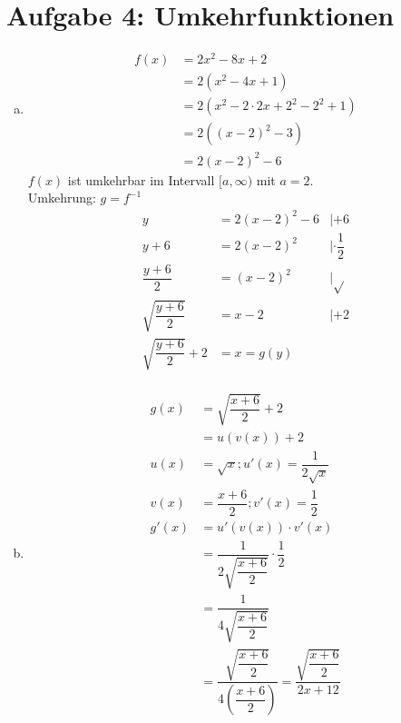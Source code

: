 \documentclass[
    10pt,
    parskip=half-,
    paper=a4,
    english,ngerman,
    fleqn
]{scrartcl}
\begin{document}
\section*{Aufgabe 4: Umkehrfunktionen}
\begin{enumerate}[a)]
\item
    \begin{align*}
        f(x) &= 2x^2 - 8x + 2\\
             &= 2(x^2 - 4x + 1)\\
             &= 2(x^2 - 2\cdot2x + 2^2 - 2^2 + 1)\\
             &= 2((x-2)^2 - 3)\\
             &= 2(x-2)^2 - 6
    \end{align*}
    $f(x)$ ist umkehrbar im Intervall $[a, \infty)$ mit $a = 2$.\\
    Umkehrung: $g = f^{-1}$
    \begin{align*}
        y &= 2(x-2)^2 - 6 &| +6\\
        y + 6 &= 2(x-2)^2 &| \cdot\dfrac{1}{2}\\
        \dfrac{y+6}{2} &= (x-2)^2 &|\sqrt{}\\
        \sqrt{\dfrac{y+6}{2}} &= x - 2 &| +2\\
        \sqrt{\dfrac{y+6}{2}} + 2 &= x = g(y)\\
    \end{align*}
\item
    \begin{align*}
        g(x) &= \sqrt{\dfrac{x+6}{2}} + 2\\
             &= u(v(x)) + 2\\
        u(x) &= \sqrt{x}; u'(x) = \dfrac{1}{2\sqrt{x}}\\
        v(x) &= \dfrac{x+6}{2}; v'(x) = \dfrac{1}{2}\\
        g'(x) &= u'(v(x)) \cdot v'(x)\\
            &= \dfrac{1}{2\sqrt{\dfrac{x+6}{2}}} \cdot \dfrac{1}{2}\\
            &= \dfrac{1}{4\sqrt{\dfrac{x+6}{2}}}\\
            &= \dfrac{ \sqrt{\dfrac{x+6}{2}} }
                { 4 \left( \dfrac{x+6}{2} \right)}
            = \dfrac{\sqrt{\dfrac{x+6}{2}}}{2x+12}
    \end{align*}
\end{enumerate}

\end{document}
